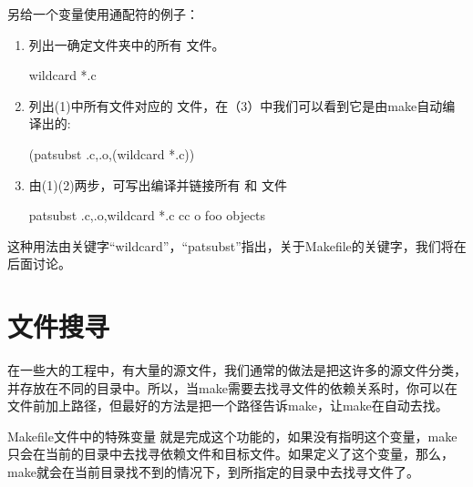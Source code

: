 \documentclass[a4paper,10pt]{sphinxmanual}
\begin{document}
另给一个变量使用通配符的例子：
\begin{enumerate}
\def\theenumi{\arabic{enumi}}
\def\labelenumi{\theenumi .}
\makeatletter\def\p@enumii{\p@enumi \theenumi .}\makeatother
\item {} 
列出一确定文件夹中的所有  文件。

\begin{sphinxVerbatim}[commandchars=\\\{\}]
  wildcard *.c
\end{sphinxVerbatim}

\item {} 
列出(1)中所有文件对应的  文件，在（3）中我们可以看到它是由make自动编译出的:

\begin{sphinxVerbatim}[commandchars=\\\{\}]
\PYGZdl{}(patsubst \PYGZpc{}.c,\PYGZpc{}.o,\PYGZdl{}(wildcard *.c))
\end{sphinxVerbatim}

\item {} 
由(1)(2)两步，可写出编译并链接所有  和  文件

\begin{sphinxVerbatim}[commandchars=\\\{\}]
  patsubst \PYGZpc{}.c,\PYGZpc{}.o,wildcard *.c
 
    cc \PYGZhy{}o foo objects
\end{sphinxVerbatim}

\end{enumerate}

这种用法由关键字“wildcard”，“patsubst”指出，关于Makefile的关键字，我们将在后面讨论。


\section{文件搜寻}
\label{\detokenize{rules:id5}}
在一些大的工程中，有大量的源文件，我们通常的做法是把这许多的源文件分类，并存放在不同的目录中。所以，当make需要去找寻文件的依赖关系时，你可以在文件前加上路径，但最好的方法是把一个路径告诉make，让make在自动去找。

Makefile文件中的特殊变量  就是完成这个功能的，如果没有指明这个变量，make只会在当前的目录中去找寻依赖文件和目标文件。如果定义了这个变量，那么，make就会在当前目录找不到的情况下，到所指定的目录中去找寻文件了。
\end{document}
